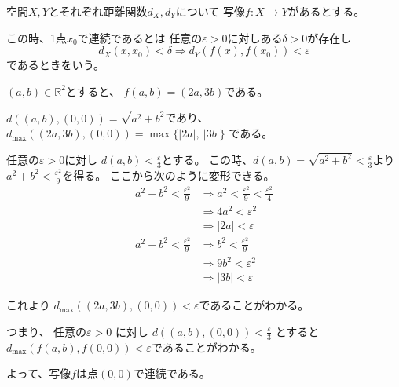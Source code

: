 \documentclass[12pt,b5paper]{ltjsarticle}
\begin{document}
\begin{enumerate}
      \dotfill

      空間$X,Y$とそれぞれ距離関数$d_X,d_Y$について
      写像$f:X\rightarrow Y$があるとする。

      この時、1点$x_0$で連続であるとは
      任意の$\varepsilon >0$に対しある$\delta >0$が存在し
      \begin{equation}
       d_X(x,x_0) < \delta \Rightarrow d_Y(f(x),f(x_0))<\varepsilon
      \end{equation}
      であるときをいう。

      \dotfill

      $(a,b)\in\mathbb{R}^2$とすると、
      $f(a,b)=(2a,3b)$である。

      $d((a,b),(0,0)) = \sqrt{a^2 + b^2}$であり、
      $d_{\max}((2a,3b),(0,0))
      = \max\{ \lvert 2a \rvert, \ \lvert 3b \rvert \}
      $
      である。

      任意の$\varepsilon > 0$に対し
      $d(a,b) < \frac{\varepsilon}{3}$とする。
      この時、$d(a,b)=\sqrt{a^2+b^2} < \frac{\varepsilon}{3}$より
      $a^2 + b^2 < \frac{\varepsilon^2}{9}$を得る。
      ここから次のように変形できる。
      \begin{align}
       a^2 + b^2 < \frac{\varepsilon^2}{9} & \Rightarrow
       a^2 < \frac{\varepsilon^2}{9} < \frac{\varepsilon^2}{4}\\
       & \Rightarrow 4a^2 < \varepsilon^2\\
       & \Rightarrow \lvert 2a \rvert < \varepsilon\\
       a^2 + b^2 < \frac{\varepsilon^2}{9} & \Rightarrow
       b^2 < \frac{\varepsilon^2}{9}\\
        & \Rightarrow 9b^2 < \varepsilon^2\\
       & \Rightarrow \lvert 3b \rvert < \varepsilon
      \end{align}

      これより $d_{\max}((2a,3b),(0,0)) < \varepsilon$であることがわかる。

      つまり、
      任意の$\varepsilon > 0$ に対し
      $d((a,b),(0,0)) < \frac{\varepsilon}{3}$
      とすると
      $d_{\max}(f(a,b),f(0,0)) < \varepsilon$であることがわかる。

      よって、写像$f$は点$(0,0)$で連続である。
\end{enumerate}
\end{document}

